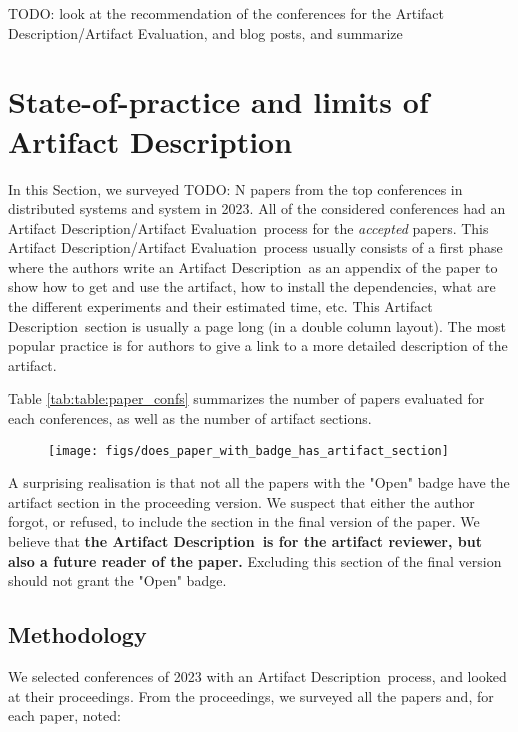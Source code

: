 \documentclass[sigconf,natbib=false]{acmart}
\newcommand{\ad}{Artifact Description}
\newcommand{\aeval}{Artifact Evaluation}
\newcommand{\adae}{\ad/\aeval}
\newcommand{\todo}[1]{{\color{red}TODO: #1}}
\begin{document}
\todo{look at the recommendation of the conferences for the \adae, and blog posts, and summarize}

%
\section{State-of-practice and limits of \ad}\label{sec:sop}



In this Section, we surveyed \todo{N} papers from the top conferences in distributed systems and system in 2023.
All of the considered conferences had an \adae\ process for the \emph{accepted} papers.
This \adae\ process usually consists of a first phase where the authors write an \ad\ as an appendix of the paper to show how to get and use the artifact, how to install the dependencies, what are the different experiments and their estimated time, etc.
This \ad\ section is usually a page long (in a double column layout).
The most popular practice is for authors to give a link to a more detailed description of the artifact.

Table \ref{tab:table:paper_confs} summarizes the number of papers evaluated for each conferences, as well as the number of artifact sections.


\begin{figure}
  \centering
  \texttt{[image: figs/does\_paper\_with\_badge\_has\_artifact\_section]}
  \caption{}\label{fig:}
\end{figure}

A surprising realisation is that not all the papers with the "Open" badge have the artifact section in the proceeding version.
We suspect that either the author forgot, or refused, to include the section in the final version of the paper.
We believe that \textbf{the \ad\ is for the artifact reviewer, but also a future reader of the paper.}
Excluding this section of the final version should not grant the "Open" badge.

\subsection{Methodology}

We selected conferences of 2023 with an \ad\ process, and looked at their proceedings.
From the proceedings, we surveyed all the papers and, for each paper, noted:
\end{document}
